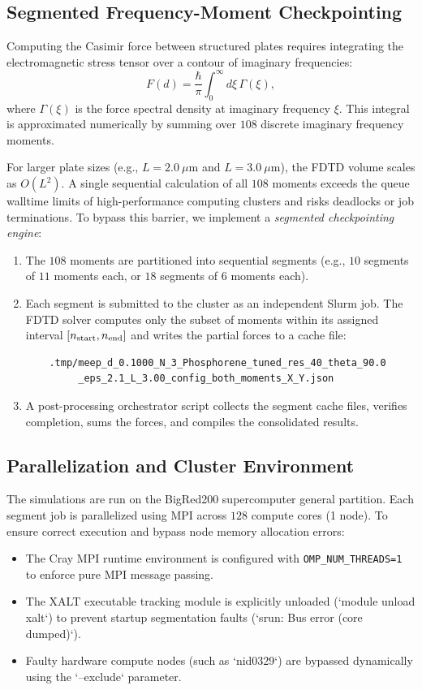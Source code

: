 \documentclass[12pt,letterpaper]{article}
\begin{document}
\subsection{Segmented Frequency-Moment Checkpointing}
Computing the Casimir force between structured plates requires integrating the electromagnetic stress tensor over a contour of imaginary frequencies:
\begin{equation}
F(d) = \frac{\hbar}{\pi} \int_0^\infty d\xi \, \Gamma(\xi),
\end{equation}
where $\Gamma(\xi)$ is the force spectral density at imaginary frequency $\xi$. This integral is approximated numerically by summing over $108$ discrete imaginary frequency moments.

For larger plate sizes (e.g., $L = 2.0\ \mu\text{m}$ and $L = 3.0\ \mu\text{m}$), the FDTD volume scales as $O(L^2)$. A single sequential calculation of all $108$ moments exceeds the queue walltime limits of high-performance computing clusters and risks deadlocks or job terminations. To bypass this barrier, we implement a \emph{segmented checkpointing engine}:
\begin{enumerate}
    \item The $108$ moments are partitioned into sequential segments (e.g., $10$ segments of $11$ moments each, or $18$ segments of $6$ moments each).
    \item Each segment is submitted to the cluster as an independent Slurm job. The FDTD solver computes only the subset of moments within its assigned interval $[n_{\rm start}, n_{\rm end}]$ and writes the partial forces to a cache file:
    \begin{verbatim}
    .tmp/meep_d_0.1000_N_3_Phosphorene_tuned_res_40_theta_90.0
         _eps_2.1_L_3.00_config_both_moments_X_Y.json
    \end{verbatim}
    \item A post-processing orchestrator script collects the segment cache files, verifies completion, sums the forces, and compiles the consolidated results.
\end{enumerate}

\subsection{Parallelization and Cluster Environment}
The simulations are run on the BigRed200 supercomputer general partition. Each segment job is parallelized using MPI across $128$ compute cores (1 node). To ensure correct execution and bypass node memory allocation errors:
\begin{itemize}
    \item The Cray MPI runtime environment is configured with \texttt{OMP\_NUM\_THREADS=1} to enforce pure MPI message passing.
    \item The XALT executable tracking module is explicitly unloaded (`module unload xalt`) to prevent startup segmentation faults (`srun: Bus error (core dumped)`).
    \item Faulty hardware compute nodes (such as `nid0329`) are bypassed dynamically using the `--exclude` parameter.
\end{itemize}
\end{document}
